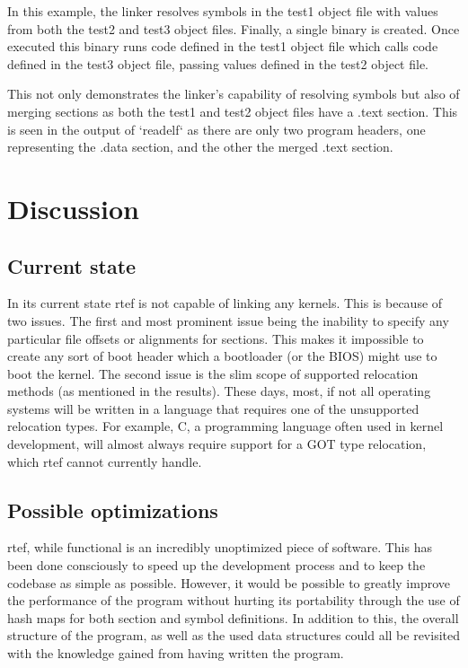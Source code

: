 \documentclass{article}
\begin{document}
In this example, the linker resolves symbols in the test1 object file with values from both the test2 and test3 object files. Finally, a single binary is created. Once executed this binary runs code defined in the test1 object file which calls code defined in the test3 object file, passing values defined in the test2 object file.

This not only demonstrates the linker's capability of resolving symbols but also of merging sections as both the test1 and test2 object files have a .text section. This is seen in the output of `readelf` as there are only two program headers, one representing the .data section, and the other the merged .text section.

\section{Discussion}

\subsection{Current state}

In its current state rtef is not capable of linking any kernels. This is because of two issues. The first and most prominent issue being the inability to specify any particular file offsets or alignments for sections. This makes it impossible to create any sort of boot header which a bootloader (or the BIOS) might use to boot the kernel. The second issue is the slim scope of supported relocation methods (as mentioned in the results). These days, most, if not all operating systems will be written in a language that requires one of the unsupported relocation types. For example, C, a programming language often used in kernel development, will almost always require support for a GOT type relocation, which rtef cannot currently handle.

\subsection{Possible optimizations}

rtef, while functional is an incredibly unoptimized piece of software. This has been done consciously to speed up the development process and to keep the codebase as simple as possible. However, it would be possible to greatly improve the performance of the program without hurting its portability through the use of hash maps for both section and symbol definitions. In addition to this, the overall structure of the program, as well as the used data structures could all be revisited with the knowledge gained from having written the program.
\end{document}
